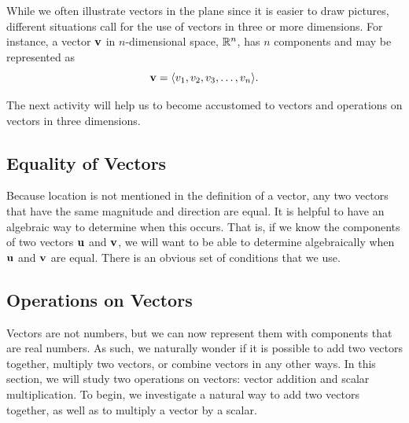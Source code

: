 While we often illustrate vectors in the plane since it is easier
to draw pictures, different situations call for the use of vectors
in three or more dimensions.  For instance, a
vector $\mathbf{v}$ in $n$-dimensional space, $\mathbb{R}^n$, has $n$
components and may be represented as
\[\mathbf{v} = \langle v_1, v_2, v_3,  \ldots, v_n \rangle.\]

The next activity will help us to become accustomed to vectors and
operations on vectors in three dimensions.



\subsection*{Equality of Vectors}

Because location is not mentioned in the
definition of a vector, any two vectors that have the same
magnitude and direction are equal. It is helpful to have an
algebraic way to determine when this occurs. That is, if we know the
components of two vectors $\mathbf{u}$ and $\mathbf{v}$, we will want to be able to
determine algebraically when $\mathbf{u}$ and $\mathbf{v}$ are equal. There is an
obvious set of conditions that we use.

%

\vspace*{5pt}
\nin {} \vspace*{5pt}

\subsection*{Operations on Vectors}

Vectors are not numbers, but we can now represent them with components
that are real numbers. As such, we naturally wonder if it is possible
to add two vectors together, multiply two vectors, or combine vectors
in any other ways. In this section, we will study two
operations on vectors: vector addition and scalar multiplication. To
begin, we investigate a natural way to add two vectors together, as
well as to multiply a vector by a scalar.

